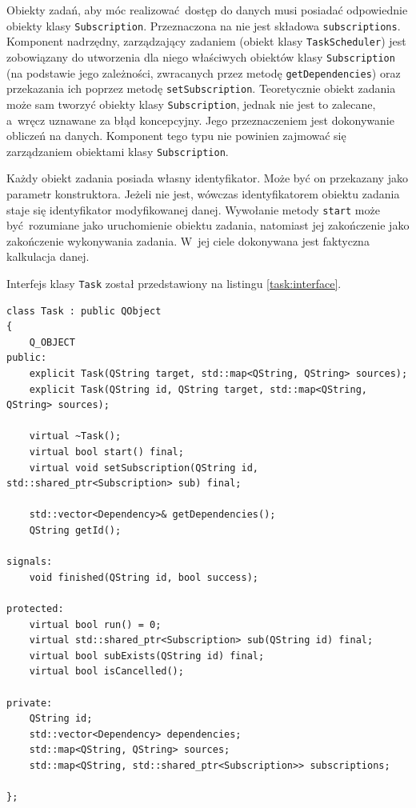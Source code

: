 Obiekty zadań, aby móc realizować dostęp do danych musi posiadać odpowiednie obiekty klasy \lstinline$Subscription$. Przeznaczona na nie jest składowa \lstinline$subscriptions$. Komponent nadrzędny, zarządzający zadaniem (obiekt klasy \lstinline$TaskScheduler$) jest zobowiązany do utworzenia dla niego właściwych obiektów klasy \lstinline$Subscription$ (na podstawie jego zależności, zwracanych przez metodę \lstinline$getDependencies$) oraz przekazania ich poprzez metodę \lstinline$setSubscription$. Teoretycznie obiekt zadania może sam tworzyć obiekty klasy \lstinline$Subscription$, jednak nie jest to zalecane, a~wręcz uznawane za błąd koncepcyjny. Jego przeznaczeniem jest dokonywanie obliczeń na danych. Komponent tego typu nie powinien zajmować się zarządzaniem obiektami klasy \lstinline$Subscription$.

Każdy obiekt zadania posiada własny identyfikator. Może być on przekazany jako parametr konstruktora. Jeżeli nie jest, wówczas identyfikatorem obiektu zadania staje się identyfikator modyfikowanej danej. Wywołanie metody \lstinline$start$ może być rozumiane jako uruchomienie obiektu zadania, natomiast jej zakończenie jako zakończenie wykonywania zadania. W~jej ciele dokonywana jest faktyczna kalkulacja danej.

Interfejs klasy \lstinline$Task$ został przedstawiony na listingu \ref{task:interface}. 

\begin{minipage}{\textwidth}
	\begin{lstlisting}[label=task:interface, caption={Interfejs klasy \lstinline$Task$},alsoletter={()[].=}]
class Task : public QObject
{
	Q_OBJECT
public:
	explicit Task(QString target, std::map<QString, QString> sources);
	explicit Task(QString id, QString target, std::map<QString, QString> sources);

	virtual ~Task();
	virtual bool start() final;
	virtual void setSubscription(QString id, std::shared_ptr<Subscription> sub) final;

	std::vector<Dependency>& getDependencies();
	QString getId();

signals:
	void finished(QString id, bool success);

protected:
	virtual bool run() = 0;
	virtual std::shared_ptr<Subscription> sub(QString id) final;
	virtual bool subExists(QString id) final;
	virtual bool isCancelled();

private:
	QString id;
	std::vector<Dependency> dependencies;
	std::map<QString, QString> sources;
	std::map<QString, std::shared_ptr<Subscription>> subscriptions;

};
	\end{lstlisting}
\end{minipage}

